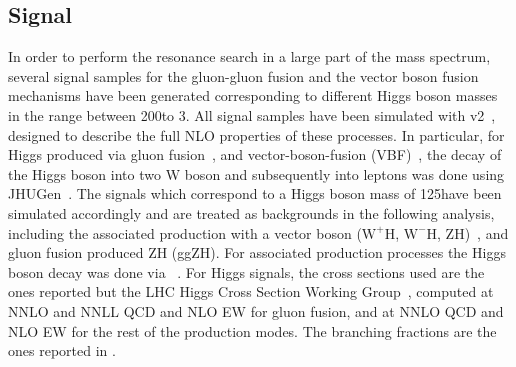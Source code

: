 \subsection*{Signal}  In order to perform the resonance search in a large part of the mass spectrum, several signal samples for the gluon-gluon fusion and the vector boson fusion mechanisms have been generated corresponding to different Higgs boson masses in the range between 200\GeV to 3\TeV. 
All signal samples have been simulated with \POWHEG v2~\cite{Nason:2004rx,Frixione:2007vw,Alioli:2010xd}, designed to describe the full NLO properties of these processes. In particular, for Higgs produced via gluon fusion~\cite{Alioli:2008tz}, and vector-boson-fusion (VBF)~\cite{Nason:2009ai},
the decay of the Higgs boson into two W boson and subsequently into leptons was done using JHUGen~\cite{jhugen}. 
The signals which correspond to a Higgs boson mass of 125\GeV have been simulated accordingly and are treated as backgrounds in the following analysis, including the associated production with a vector boson ($\mathrm{W^{+}H}$, $\mathrm{W^{-}H}$, ZH)~\cite{Luisoni:2013kna}, and gluon fusion produced ZH (ggZH). For associated production processes the Higgs boson decay was done via ~\cite{Sjostrand:2007gs}.
For Higgs signals, the cross sections used are the ones reported but the LHC Higgs Cross Section Working Group~\cite{temphiggsxsecs},
computed at NNLO and NNLL QCD and NLO EW for gluon fusion, and at NNLO QCD and NLO EW for the rest of the production modes.
The branching fractions are the ones reported in \cite{Heinemeyer:2013tqa}. 




